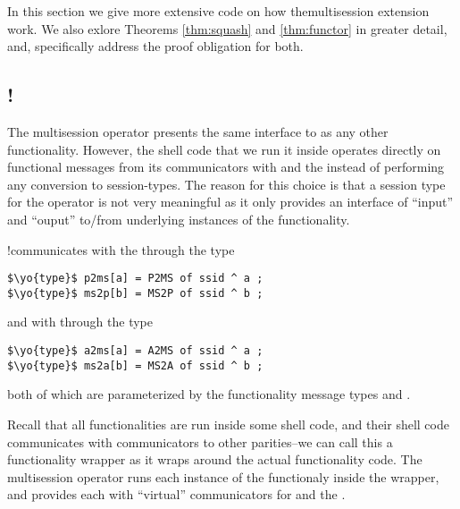 In this section we give more extensive code on how themultisession extension work. We also exlore Theorems \ref{thm:squash} and \ref{thm:functor} in greater detail, and, specifically address the proof obligation for both.

\subsection{!\F}
The multisession operator presents the same interface to  as any other functionality.
However, the shell code that we run it inside operates directly on functional messages from its communicators with \F and the \partywrapper instead of performing any conversion to session-types.
The reason for this choice is that a session type for the operator is not very meaningful as it only provides an interface of ``input'' and ``ouput'' to/from underlying instances of the functionality.

!\F communicates with the \partywrapper through the type
\begin{lstlisting}[basicstyle=\small\BeraMonottFamily, mathescape]
$\yo{type}$ p2ms[a] = P2MS of ssid ^ a ;
$\yo{type}$ ms2p[b] = MS2P of ssid ^ b ;
\end{lstlisting}
and with \A through the type
\begin{lstlisting}[basicstyle=\small\BeraMonottFamily, mathescape]
$\yo{type}$ a2ms[a] = A2MS of ssid ^ a ;
$\yo{type}$ ms2a[b] = MS2A of ssid ^ b ;
\end{lstlisting}
both of which are parameterized by the functionality message types  and .


Recall that all functionalities are run inside some shell code, and their shell code communicates with communicators to other parities--we can call this a functionality wrapper as it wraps around the actual functionality code.
The multisession operator runs each instance of the functionaly inside the wrapper, and provides each with ``virtual'' communicators for \A and the \partywrapper.


